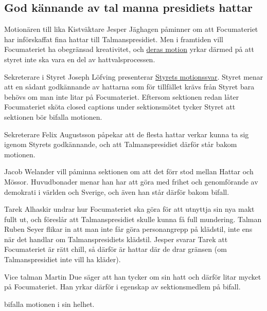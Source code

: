\documentclass[hidelinks]{sektionsmote} %
\begin{document}
\subsection{God kännande av tal manna presidiets hattar}
Motionären till lika Kistväktare Jesper Jäghagen påminner om att Focumateriet har införskaffat fina hattar till Talmanspresidiet.
Men i framtiden vill Focumateriet ha obegränsad kreativitet, och \hyperlink{bilagor/motionfoc.pdf.1}{deras motion} yrkar därmed på att styret inte ska vara en del av hattvalsprocessen.\par
Sekreterare i Styret Joseph Löfving presenterar \hyperlink{bilagor/motionfoc-svar.pdf.1}{Styrets motionssvar}.
Styret menar att en sådant godkännande av hattarna som för tillfället krävs från Styret bara behövs om man inte litar på Focumateriet.
Eftersom sektionen redan låter Focumateriet sköta closed captions under sektionsmötet tycker Styret att sektionen bör bifalla motionen.\par
Sekreterare Felix Augustsson påpekar att de flesta hattar verkar kunna ta sig igenom Styrets godkännande, och att Talmanspresidiet därför står bakom motionen.\par
Jacob Welander vill påminna sektionen om att det förr stod mellan Hattar och Mössor.
Huvudbonader menar han har att göra med frihet och genomförande av demokrati i världen och Sverige, och även han står därför bakom bifall.\par
Tarek Alhaskir undrar hur Focumateriet ska göra för att utnyttja sin nya makt fullt ut, och föreslår att Talmanspresidiet skulle kunna få full mundering.
Talman Ruben Seyer flikar in att man inte får göra personangrepp på klädstil, inte ens när det handlar om Talmanspresidiets klädstil.
Jesper svarar Tarek att Focumateriet är rätt chill, så därför är hattar där de drar gränsen (om Talmanspresidiet inte vill ha kläder).\par
Vice talman Martin Due säger att han tycker om sin hatt och därför litar mycket på Focumateriet.
Han yrkar därför i egenskap av sektionsmedlem på bifall.

\begin{beslut}
  \item bifalla motionen i sin helhet.
\end{beslut}
\end{document}
